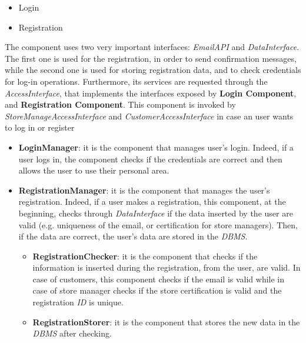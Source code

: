 \documentclass{article}
\begin{document}
					\begin{itemize}
						\item Login
						\item Registration
					\end{itemize}
				
					The component uses two very important interfaces: \emph{EmailAPI} and \emph{DataInterface}. The first one is used for the registration, in order to send confirmation messages, while the second one is used for storing registration data, and to check credentials for log-in operations. Furthermore, its services are requested through the \emph{AccessInterface}, that implements the interfaces exposed by {\bfseries Login Component}, and {\bfseries Registration Component}. This component is invoked by \emph{StoreManageAccessInterface} and \emph{CustomerAccessInterface} in case an user wants to log in or register
					
					\begin{itemize}
						\item {\bfseries LoginManager}: it is the component that manages user’s login. Indeed, if a user logs in, the component checks if the credentials are correct and then allows the user to use their personal area.
						
						\item {\bfseries RegistrationManager}: it is the component that manages the user’s registration. Indeed, if a user makes a registration, this component, at the beginning, checks through \emph{DataInterface} if the data inserted by the user are valid (e.g. uniqueness of the email, or certification for store managers). Then, if the data are correct, the user’s data are stored in the \emph{DBMS}.
						
						\begin{itemize}
							\item {\bfseries RegistrationChecker}: it is the component that checks if the information is inserted during the registration, from the user, are valid. In case of customers, this component checks if the email is valid while in case of store manager checks if the store certification is valid and the registration \emph{ID} is unique.
							
							\item {\bfseries RegistrationStorer}: it is the component that stores the new data in the \emph{DBMS} after checking.
						\end{itemize}
					\end{itemize}
				
\end{document}
